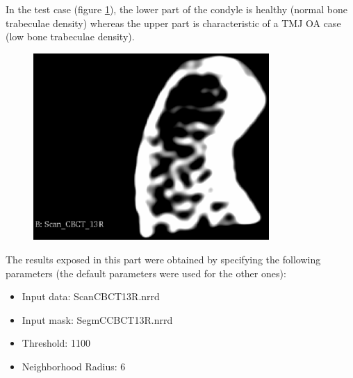 \documentclass{InsightArticle}
\begin{document}
In the test case (figure \ref{fig:Scan}), the lower part of the condyle is healthy (normal bone trabeculae density) whereas the upper part is characteristic of a TMJ OA case (low bone trabeculae density).

\begin{figure}[H]
  \begin{center}
    \includegraphics[width=0.8\textwidth]{figures/Scan.eps}
    \label{fig:Scan}
  \end{center}
\end{figure}

The results exposed in this part were obtained by specifying the following parameters (the default parameters were used for the other ones):

\begin{itemize}
 \item Input data: Scan\textunderscore CBCT\textunderscore 13R.nrrd
 \item Input mask: SegmC\textunderscore CBCT\textunderscore 13R.nrrd
 \item Threshold: 1100
 \item Neighborhood Radius: 6
\end{itemize}
\end{document}
